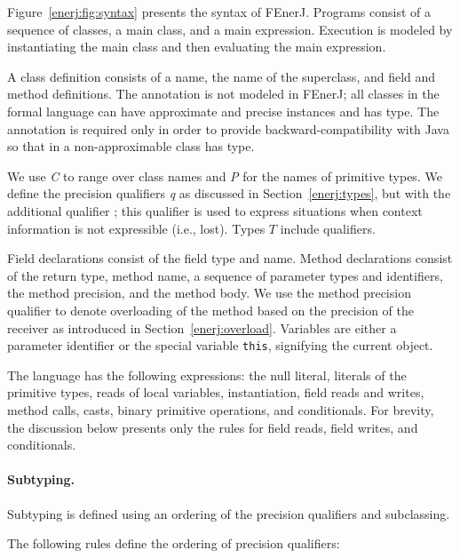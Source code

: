 Figure~\ref{enerj:fig:syntax} presents the syntax of FEnerJ.
Programs consist of a sequence of classes, a main class, and a main
expression. Execution is modeled by instantiating
the main class and then evaluating the main expression.

A class definition consists of a name, the name of the superclass, and
field and method definitions.
The  annotation is not modeled in FEnerJ; all classes in
the formal language can have approximate and precise instances and
 has  type.
The annotation is required only in order
to provide backward-compatibility with Java so that  in a
non-approximable class has  type.

We use \textit{C} to range over class names and \textit{P} for the
names of primitive types.
We define the precision qualifiers \textit{q} as discussed in Section~\ref{enerj:types},
but with the additional qualifier \lost{}; this qualifier is used to
express situations when context information is not expressible
(i.e., lost).
Types $T$ include qualifiers.

Field declarations consist of the field type and name.
Method declarations consist of the return type, method name, a
sequence of parameter types and identifiers, the method precision, and
the method body. We use the method precision qualifier to denote
overloading of the method based on the precision of the receiver as
introduced in Section~\ref{enerj:overload}.
Variables are either a parameter identifier or the special variable
\texttt{this}, signifying the current object.

The language has the following expressions:
the null literal,
literals of the primitive types,
reads of local variables,
instantiation,
field reads and writes,
method calls,
casts,
binary primitive operations, and
conditionals.
For brevity, the discussion below presents only the
rules for field reads, field writes, and conditionals.


\paragraph{Subtyping.}
Subtyping is defined using an ordering of the precision qualifiers and
subclassing.

\renewcommand{\ottdrulename}[1]{}

The following rules define the ordering of precision qualifiers:


